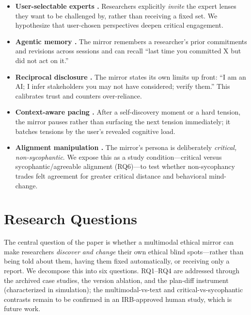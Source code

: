 \documentclass[sigconf,screen]{acmart}
\begin{document}
\begin{itemize}
  \item \textbf{User-selectable experts \citep{perspectra26}.} Researchers
    explicitly \emph{invite} the expert lenses they want to be challenged by,
    rather than receiving a fixed set. We hypothesize that user-chosen
    perspectives deepen critical engagement.
  \item \textbf{Agentic memory \citep{recallbot26}.} The mirror remembers a
    researcher's prior commitments and revisions across sessions and can recall
    ``last time you committed X but did not act on it.''
  \item \textbf{Reciprocal disclosure \citep{recallbot26}.} The mirror states
    its own limits up front: ``I am an AI; I infer stakeholders you may not have
    considered; verify them.'' This calibrates trust and counters
    over-reliance.
  \item \textbf{Context-aware pacing \citep{hearinsilence26}.} After a
    self-discovery moment or a hard tension, the mirror pauses rather than
    surfacing the next tension immediately; it batches tensions by the user's
    revealed cognitive load.
  \item \textbf{Alignment manipulation \citep{vibecheck26}.} The mirror's
    persona is deliberately \emph{critical, non-sycophantic}. We expose this as
    a study condition---critical versus sycophantic/agreeable alignment (RQ6)---to
    test whether non-sycophancy trades felt agreement for greater critical
    distance and behavioral mind-change.
\end{itemize}

\section{Research Questions}

The central question of the paper is whether a multimodal ethical mirror can
make researchers \emph{discover and change} their own ethical blind spots---rather
than being told about them, having them fixed automatically, or receiving only
a report. We decompose this into six questions. RQ1--RQ4 are addressed through the
archived case studies, the version ablation, and the plan-diff instrument
(characterized in simulation); the multimodal-vs-text and
critical-vs-sycophantic contrasts remain to be confirmed in an IRB-approved
human study, which is future work.
\end{document}
